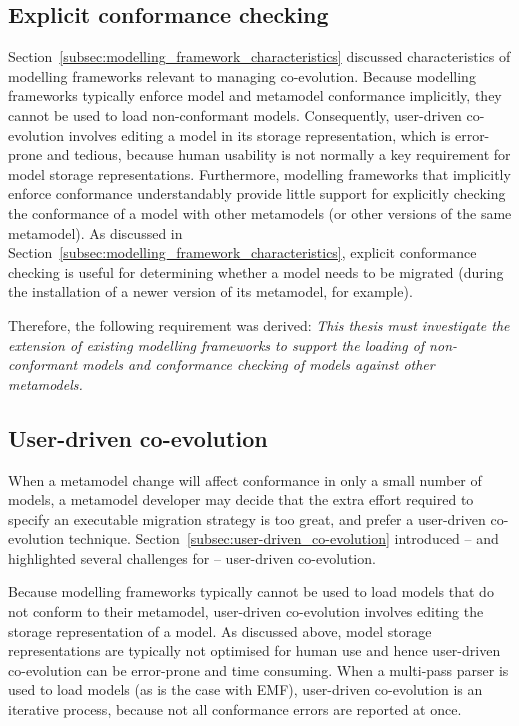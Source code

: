\subsection{Explicit conformance checking}
Section~\ref{subsec:modelling_framework_characteristics} discussed characteristics of modelling frameworks relevant to managing co-evolution. Because modelling frameworks typically enforce model and metamodel conformance implicitly, they cannot be used to load non-conformant models. Consequently, user-driven co-evolution involves editing a model in its storage representation, which is error-prone and tedious, because human usability is not normally a key requirement for model storage representations. Furthermore, modelling frameworks that implicitly enforce conformance understandably provide little support for explicitly checking the conformance of a model with other metamodels (or other versions of the same metamodel). As discussed in Section~\ref{subsec:modelling_framework_characteristics}, explicit conformance checking is useful for determining whether a model needs to be migrated (during the installation of a newer version of its metamodel, for example).

Therefore, the following requirement was derived: \emph{This thesis must investigate the extension of existing modelling frameworks to support the loading of non-conformant models and conformance checking of models against other metamodels.}




\subsection{User-driven co-evolution}
When a metamodel change will affect conformance in only a small number of models, a metamodel developer may decide that the extra effort required to specify an executable migration strategy is too great, and prefer a user-driven co-evolution technique. Section~\ref{subsec:user-driven_co-evolution} introduced -- and highlighted several challenges for -- user-driven co-evolution.

Because modelling frameworks typically cannot be used to load models that do not conform to their metamodel, user-driven co-evolution involves editing the storage representation of a model. As discussed above, model storage representations are typically not optimised for human use and hence user-driven co-evolution can be error-prone and time consuming. When a multi-pass parser is used to load models (as is the case with EMF), user-driven co-evolution is an iterative process, because not all conformance errors are reported at once.

